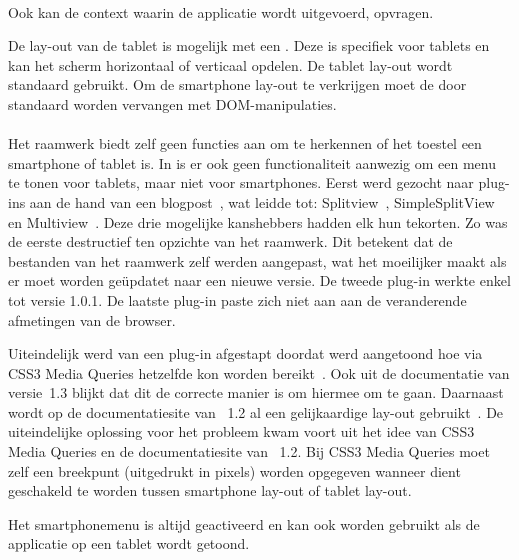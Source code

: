 \paragraph{\kendo}
Ook \kendo{} kan de context waarin de applicatie wordt uitgevoerd, opvragen.

De lay-out van de tablet is mogelijk met een .
Deze  is specifiek voor tablets en kan het scherm horizontaal of verticaal opdelen.
De tablet lay-out wordt standaard gebruikt.
Om de smartphone lay-out te verkrijgen moet de  door standaard  worden vervangen met DOM-manipulaties.

\paragraph{\jqm}
Het raamwerk biedt zelf geen functies aan om te herkennen of het toestel een smartphone of tablet is.
In \jqm{} is er ook geen functionaliteit aanwezig om een menu te tonen voor tablets, maar niet voor smartphones. 
Eerst werd gezocht naar plug-ins aan de hand van een blogpost~\cite{Deering2012}, wat leidde tot: Splitview~\cite{Rahman2013}, SimpleSplitView~\cite{Yared2013} en Multiview~\cite{Franck2012}. 
Deze drie mogelijke kanshebbers hadden elk hun tekorten. 
Zo was de eerste destructief ten opzichte van het raamwerk.
Dit betekent dat de bestanden van het raamwerk zelf werden aangepast, wat het moeilijker maakt als er moet worden geüpdatet naar een nieuwe versie. 
De tweede plug-in werkte enkel tot versie 1.0.1.
De laatste plug-in paste zich niet aan aan de veranderende afmetingen van de browser. 

Uiteindelijk werd van een plug-in afgestapt doordat werd aangetoond hoe via CSS3 Media Queries hetzelfde kon worden bereikt~\cite{Hadlock2012}. 
Ook uit de documentatie van versie~1.3 \cite{JQuery2013e} blijkt dat dit de correcte manier is om hiermee om te gaan.
Daarnaast wordt op de documentatiesite van \jqm{}~1.2 al een gelijkaardige lay-out gebruikt~\cite{JQuery2012b}. 
De uiteindelijke oplossing voor het probleem kwam voort uit het idee van CSS3 Media Queries en de documentatiesite van \jqm{}~1.2.
Bij CSS3 Media Queries moet zelf een breekpunt (uitgedrukt in pixels) worden opgegeven wanneer dient geschakeld te worden tussen smartphone lay-out of tablet lay-out.

Het smartphonemenu is altijd geactiveerd en kan ook worden gebruikt als de applicatie op een tablet wordt getoond.

